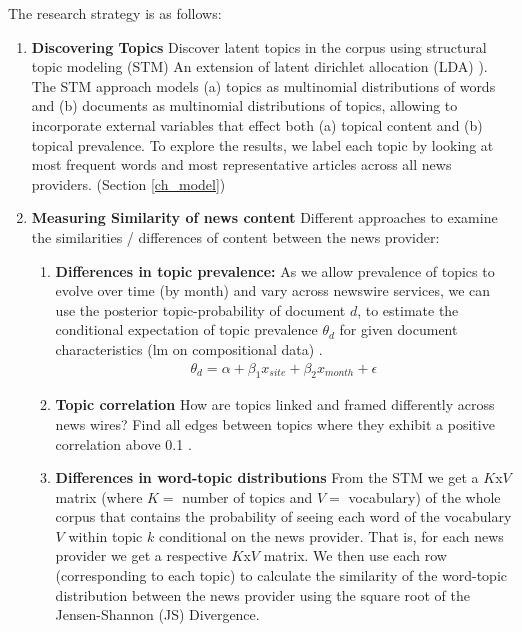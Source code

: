 \documentclass[12pt,a4paper,notitlepage]{article}
\begin{document}
The research strategy is as follows:

\begin{enumerate}
	\item \textbf{Discovering Topics} Discover latent topics in the corpus using structural topic modeling (STM)\citep{roberts_model_2016} An extension of latent dirichlet allocation (LDA) \citep{blei_latent_2003}). The STM approach models (a) topics as multinomial distributions of words and (b) documents as multinomial distributions of topics, allowing to incorporate external variables that effect both (a) topical content and (b) topical prevalence. To explore the results, we label each topic by looking at most frequent words and most representative articles across all news providers. (Section \ref{ch_model})

	\item \textbf{Measuring Similarity of news content} Different approaches to examine the similarities / differences of content between the news provider:
	\begin{enumerate}
		\item \textbf{Differences in topic prevalence:} As we allow prevalence of topics to evolve over time (by month) and vary across newswire services, we can use the posterior topic-probability of document $d$, to estimate the conditional expectation of topic prevalence $\theta_d$ for given document characteristics (lm on compositional data) \citep{roberts_model_2016}. 
		\begin{align*}
			\theta_d=\alpha+\beta_1x_{site}+\beta_2x_{month}+\epsilon
		\end{align*}
		
		\item \textbf{Topic correlation} How are topics linked and framed differently across news wires? Find all edges between topics where they exhibit a positive correlation above 0.1 \citep{roberts_model_2016}.

		\item \textbf{Differences in word-topic distributions} From the STM we get a $K$x$V$ matrix (where $K=$ number of topics and $V=$ vocabulary) of the whole corpus that contains the probability of seeing each word of the vocabulary $V$ within topic $k$ conditional on the news provider. That is, for each news provider we get a respective $K$x$V$ matrix. We then use each row (corresponding to each topic) to calculate the similarity of the word-topic distribution between the news provider using the square root of the Jensen-Shannon (JS) Divergence.
		

\end{enumerate}
\end{enumerate}
\end{document}
